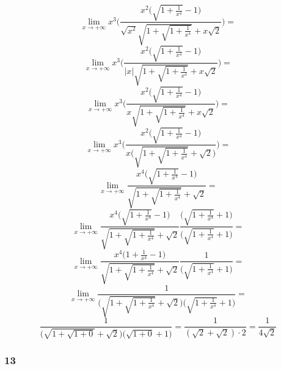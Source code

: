 \documentclass{article}
\begin{document}
\begin{equation*}
    \lim_{x \to + \infty} x^{3} \Bigg(\frac{ x^2 \Big(\sqrt{1 + \frac{1}{x^4}} - 1 \Big)}{\sqrt{x^{2}} \sqrt{1 + \sqrt{1 + \frac{1}{x^4}}} + x\sqrt{2}}\Bigg) =
\end{equation*}
\begin{equation*}
    \lim_{x \to + \infty} x^{3} \Bigg(\frac{ x^2 \Big(\sqrt{1 + \frac{1}{x^4}} - 1 \Big)}{|x| \sqrt{1 + \sqrt{1 + \frac{1}{x^4}}} + x\sqrt{2}}\Bigg) =
\end{equation*}
\begin{equation*}
    \lim_{x \to + \infty} x^{3} \Bigg(\frac{ x^2 \Big(\sqrt{1 + \frac{1}{x^4}} - 1 \Big)}{x \sqrt{1 + \sqrt{1 + \frac{1}{x^4}}} + x\sqrt{2}}\Bigg) =
\end{equation*}
\begin{equation*}
    \lim_{x \to + \infty} x^{3} \Bigg(\frac{ x^2 \Big(\sqrt{1 + \frac{1}{x^4}} - 1 \Big)}{x \Bigg(\sqrt{1 + \sqrt{1 + \frac{1}{x^4}}} + \sqrt{2}\Bigg)}\Bigg) =
\end{equation*}
\begin{equation*}
    \lim_{x \to + \infty}  \frac{ x^{4} \Big(\sqrt{1 + \frac{1}{x^4}} - 1 \Big)}{\sqrt{1 + \sqrt{1 + \frac{1}{x^4}}} + \sqrt{2}} =
\end{equation*}
\begin{equation*}
    \lim_{x \to + \infty}  \frac{ x^{4} \Big(\sqrt{1 + \frac{1}{x^4}} - 1 \Big)}{\sqrt{1 + \sqrt{1 + \frac{1}{x^4}}} + \sqrt{2}}\frac{\Big(\sqrt{1 + \frac{1}{x^4}} + 1 \Big)}{\Big(\sqrt{1 + \frac{1}{x^4}} + 1 \Big)} =
\end{equation*}
\begin{equation*}
    \lim_{x \to + \infty}  \frac{ x^{4} \Big(1 + \frac{1}{x^4} - 1 \Big)}{\sqrt{1 + \sqrt{1 + \frac{1}{x^4}}} + \sqrt{2}}\frac{1}{\Big(\sqrt{1 + \frac{1}{x^4}} + 1 \Big)} =
\end{equation*}
\begin{equation*}
    \lim_{x \to + \infty}  \frac{ 1}{\Big(\sqrt{1 + \sqrt{1 + \frac{1}{x^4}}} + \sqrt{2}\Big) \Big(\sqrt{1 + \frac{1}{x^4}} + 1 \Big)} =
\end{equation*}
\begin{equation*}
    \frac{ 1}{\Big(\sqrt{1 + \sqrt{1 + 0}} + \sqrt{2}\Big) \Big(\sqrt{1 + 0} + 1 \Big)} = \frac{1}{(\sqrt{2} + \sqrt{2}) \cdot 2} = \frac{1}{4\sqrt{2}} 
\end{equation*}


\subsubsection*{13}
\end{document}
